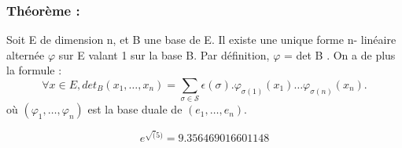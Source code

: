 \documentclass[a4paper,12pt]{article}
\begin{document}
\subsubsection{\textbf{Théorème :}}
Soit E de dimension n, et B une base de E. Il existe une unique forme n-
linéaire alternée $\varphi$ sur E valant 1 sur la base B. Par déﬁnition, $\varphi$ = det B . On a de plus la
formule :
\begin{equation}\forall x \in E, det_B(x_1,\hdots,x_n)=\sum_{\sigma \in \mathcal{S}} 
\epsilon (\sigma).\varphi_{\sigma(1)}(x_1)\hdots \varphi_{\sigma(n)}(x_n).\end{equation}
où $(\varphi_1,\hdots,\varphi_n)$ est la base duale de $(e_1,\hdots,e_n)$.

\begin{equation}e^{\sqrt(5)} = 9.356469016601148\end{equation}
\end{document}
